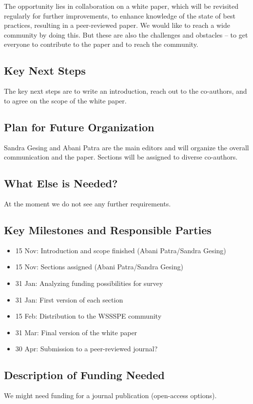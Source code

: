 The opportunity lies in collaboration on a white paper, which will be revisited
regularly for further improvements, to enhance knowledge of the state of best
practices, resulting in a peer-reviewed paper. We would like to reach a wide
community by doing this. But these are also the challenges and obstacles -- to
get everyone to contribute to the paper and to reach the community.

\subsection{Key Next Steps}

The key next steps are to write an introduction, reach out to the co-authors,
and to agree on the scope of the white paper.

\subsection{Plan for Future Organization}

Sandra Gesing and Abani Patra are the main editors and will organize the overall
communication and the paper. Sections will be assigned to diverse co-authors.

\subsection{What Else is Needed?}

At the moment we do not see any further requirements.

\subsection{Key Milestones and Responsible Parties}
\begin{itemize}
\item 15 Nov: Introduction and scope finished (Abani Patra/Sandra Gesing)
\item 15 Nov: Sections assigned (Abani Patra/Sandra Gesing)
\item 31 Jan: Analyzing funding possibilities for survey
\item 31 Jan: First version of each section
\item 15 Feb: Distribution to the WSSSPE community
\item 31 Mar: Final version of the white paper
\item 30 Apr: Submission to a peer-reviewed journal?
\end{itemize}

\subsection{Description of Funding Needed}
We might need funding for a journal publication (open-access options).
